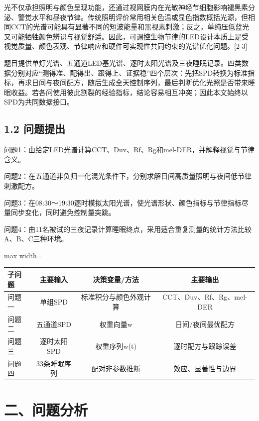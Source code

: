 \documentclass[UTF8,a4paper,12pt]{ctexart}
\begin{document}
光不仅承担照明与颜色呈现功能，还通过视网膜内在光敏神经节细胞影响褪黑素分泌、警觉水平和昼夜节律。传统照明评价常用相关色温或显色指数概括光源，但相同CCT的光谱可能具有显著不同的短波能量和黑视素刺激；反之，单纯压低蓝光又可能牺牲颜色辨识与视觉舒适。因此，可调控生物节律的LED设计本质上是受视觉质量、颜色表观、节律响应和硬件可实现性共同约束的光谱优化问题。[2-3]

题目提供单灯光谱、五通道LED基光谱、逐时太阳光谱及三夜睡眠记录。四类数据分别对应“测得准、配得出、跟得上、证据稳”四个层次：先把SPD转换为标准指标，再求日间与夜间配方，随后生成全天控制序列，最后判断优化光照是否带来睡眠收益。若各问使用彼此割裂的经验指标，结论容易相互冲突；因此本文始终以SPD为共同数据接口。

\subsection{1.2 问题提出}

问题1：由给定LED光谱计算CCT、Duv、Rf、Rg和mel-DER，并解释视觉与节律含义。

问题2：在五通道非负归一化混光条件下，分别求解日间高质量照明与夜间低节律刺激配方。

问题3：在08:30～19:30逐时模拟太阳光谱，使光谱形状、颜色指标与节律指标尽量同步变化，同时避免控制量突跳。

问题4：由11名被试的三夜记录计算睡眠终点，采用适合重复测量的统计方法比较A、B、C三种环境。

\begin{table}[H]
\centering
\small
\begin{adjustbox}{max width=\textwidth}
\begin{tabular}{lccc}
\toprule
子问题 & 主要输入 & 决策变量/方法 & 主要输出 \\
\midrule
问题一 & 单组SPD & 标准积分与颜色外观计算 & CCT、Duv、Rf、Rg、mel-DER \\
问题二 & 五通道SPD & 权重向量w & 日间/夜间最优配方 \\
问题三 & 逐时太阳SPD & 权重序列w(t) & 逐时配方与跟踪误差 \\
问题四 & 33条睡眠序列 & 配对非参数推断 & 效应、显著性与边界 \\
\bottomrule
\end{tabular}
\end{adjustbox}
\end{table}

\section{二、问题分析}
\end{document}
